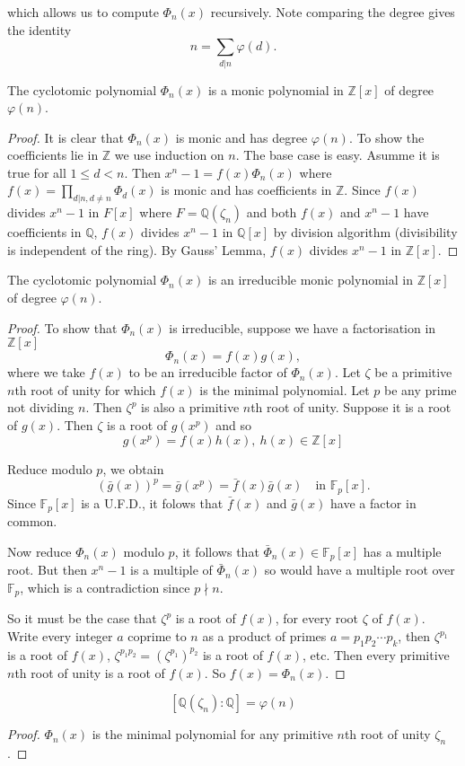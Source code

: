 \documentclass[a4paper]{article}
\begin{document}
which allows us to compute $\Phi_n(x)$ recursively. Note comparing the degree gives the identity
\[ n = \sum_{d|n} \varphi(d). \]

\begin{lem}
  The cyclotomic polynomial $\Phi_n(x)$ is a monic polynomial in $\mathbb Z[x]$ of degree $\varphi(n)$.
\end{lem}

\begin{proof}
  It is clear that $\Phi_n(x)$ is monic and has degree $\varphi(n)$. To show the coefficients lie in $\mathbb Z$ we use induction on $n$. The base case is easy. Asumme it is true for all $1 \leq d < n$. Then $x^n-1 = f(x) \Phi_n(x)$ where $f(x) = \prod_{d|n,d\neq n} \Phi_d(x)$ is monic and has coefficients in $\mathbb Z$. Since $f(x)$ divides $x^n - 1$ in $F[x]$ where $F=\mathbb Q(\zeta_n)$ and both $f(x)$ and $x^n - 1$ have coefficients in $\mathbb Q$, $f(x)$ divides $x^n - 1$ in $\mathbb Q[x]$ by division algorithm (divisibility is independent of the ring). By Gauss' Lemma, $f(x)$ divides $x^n -1 $ in $\mathbb Z[x]$.
\end{proof}

\begin{thm}
  The cyclotomic polynomial $\Phi_n(x)$ is an irreducible monic polynomial in $\mathbb Z[x]$ of degree $\varphi(n)$.
\end{thm}

\begin{proof}
  To show that $\Phi_n(x)$ is irreducible, suppose we have a factorisation in $\mathbb Z[x]$
  \[ \Phi_n(x) = f(x)g(x), \]
  where we take $f(x)$ to be an irreducible factor of $\Phi_n(x)$. Let $\zeta$ be a primitive $n$th root of unity for which $f(x)$ is the minimal polynomial. Let $p$ be any prime not dividing $n$. Then $\zeta^p$ is also a primitive $n$th root of unity. Suppose it is a root of $g(x)$. Then $\zeta$ is a root of $g(x^p)$ and so
  \[ g(x^p) = f(x)h(x), \: h(x) \in \mathbb Z[x] \]

  Reduce modulo $p$, we obtain
  \[ (\bar g(x))^p = \bar g(x^p) = \bar f(x) \bar g(x) \quad \text{in } \mathbb F_p[x]. \]
  Since $\mathbb F_p[x]$ is a U.F.D., it folows that $\bar f(x)$ and $\bar g(x)$ have a factor in common.

  Now reduce $\Phi_n(x)$ modulo $p$, it follows that $\bar \Phi_n(x) \in \mathbb F_p[x]$ has a multiple root. But then $x^n-1$ is a multiple of $\bar \Phi_n(x)$ so would have a multiple root over $\mathbb F_p$, which is a contradiction since $p \nmid n$.

  So it must be the case that $\zeta^p$ is a root of $f(x)$, for every root $\zeta$ of $f(x)$. Write every integer $a$ coprime to $n$ as a product of primes $a = p_1p_2\cdots p_k$, then $\zeta^{p_1}$ is a root of $f(x)$, $\zeta^{p_1p_2} = (\zeta^{p_1})^{p_2}$ is a root of $f(x)$, etc. Then every primitive $n$th root of unity is a root of $f(x)$. So $f(x) = \Phi_n(x)$.
\end{proof}

\begin{cor}
  \[ [\mathbb Q(\zeta_n): \mathbb Q] = \varphi(n) \]
\end{cor}

\begin{proof}
  $\Phi_n(x)$ is the minimal polynomial for any primitive $n$th root of unity $\zeta_n$.
\end{proof}
\end{document}
